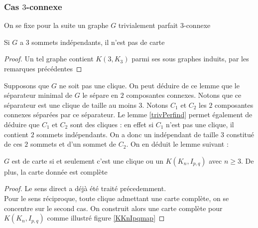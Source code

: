 \documentclass{scrartcl}
\begin{document}
\begin{flushleft}
\subsubsection{Cas $3$-connexe}

On se fixe pour la suite un graphe $G$ trivialement parfait $3$-connexe

\begin{lem}\label{trivPerfind}
    Si $G$ a $3$ sommets indépendants, il n'est pas de carte
\end{lem}

\begin{proof}
    Un tel graphe contient $K(3, K_3)$ parmi ses sous graphes induits, par les remarques précédentes
\end{proof}

Supposons que $G$ ne soit pas une clique.
On peut déduire de ce lemme que le séparateur minimal de $G$ le sépare en $2$ composantes connexes. Notons que ce séparateur est une
clique de taille au moins $3$. Notons $C_1$ et $C_2$ les $2$ composantes connexes séparées par ce séparateur. Le lemme
\ref{trivPerfind} permet également de déduire que $C_1$ et $C_2$ sont des cliques : en effet si $C_1$ n'est pas une clique,
il contient $2$ sommets indépendants. On a donc un indépendant de taille $3$ constitué de ces $2$ sommets et d'un sommet de $C_2$.
On en déduit le lemme suivant :

\begin{lem}\label{trivPar3conn}
    $G$ est de carte si et seulement c'est une clique ou un $K(K_n, I_{p,q})$ avec $n \geq 3$. De plus, la carte
    donnée est complète
\end{lem}

\begin{proof}
    Le sens direct a déjà été traité précedemment.\\
    Pour le sens réciproque, toute clique admettant une carte complète, on se concentre sur le second cas. On construit
    alors une carte complète pour $K(K_n, I_{p,q})$ comme illustré figure \ref{KKnIpqmap}
\end{proof}


\end{flushleft}
\end{document}
